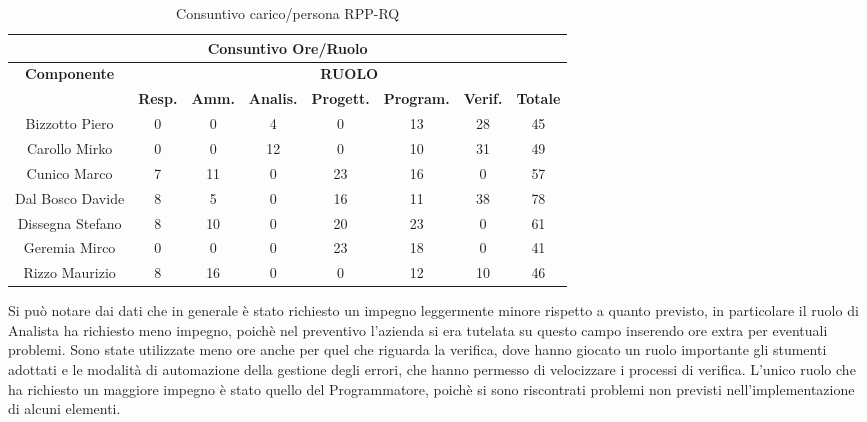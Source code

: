 \begin{table}[!h]
	\begin{center}
		  \begin{tabular}
			  {|c|c|c|c|c|c|c|c|}
		 \hline
			\multicolumn{8}{|c|}{ \textbf{Consuntivo Ore/Ruolo} } \\
			\hline
			\textbf{Componente} & \multicolumn{7}{|c|}{ \textbf{RUOLO} } \\
			\hline
			& \textbf{Resp.} & \textbf{Amm.} & \textbf{Analis.} & \textbf{Progett.} & \textbf{Program.} & \textbf{Verif.}  & \textbf{Totale}\\
			\hline
			Bizzotto Piero 		&  0  &  0  &  4  &  0  &  13 &  28 &  45 \\ %
			\hline
			Carollo Mirko 		&  0  &  0  &  12 &  0  &  10 &  31 &  49\\ %
			\hline
			Cunico Marco    	&  7  &  11 &  0  &  23 &  16 &  0  &  57\\ %
			\hline
			Dal Bosco Davide   	&  8  &  5  &  0  &  16 &  11 &  38 &  78\\ %
			\hline
			Dissegna Stefano    &  8  &  10 &  0  &  20 &  23 &  0  &  61\\ %
			\hline
			Geremia Mirco   	&  0  &  0  &  0  &  23 &  18 &  0  &  41\\ %
			\hline	
			Rizzo Maurizio  	&  8  &  16 &  0  &  0  &  12 &  10  &  46\\ %
			\hline	
		\end{tabular}
	\caption{Consuntivo carico/persona RPP-RQ} %
	\label{tab: ConsPersOre_RPP-RQ}
	\end{center}	
\end{table}

Si pu\`o notare dai dati che in generale \`e stato richiesto un impegno leggermente minore rispetto a quanto previsto, in particolare il ruolo di Analista ha richiesto meno impegno, poich\`e nel preventivo l'azienda si era tutelata su questo campo inserendo ore extra per eventuali problemi. Sono state utilizzate meno ore anche per quel che riguarda la verifica, dove hanno giocato un ruolo importante gli stumenti adottati e le modalit\`a di automazione della gestione degli errori, che hanno permesso di velocizzare i processi di verifica. L'unico ruolo che ha richiesto un maggiore impegno \`e stato quello del Programmatore, poich\`e si sono riscontrati problemi non previsti nell'implementazione di alcuni elementi.


